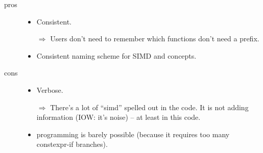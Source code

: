 \begin{description}
  \item[pros]
    \begin{itemize}
      \item Consistent.
      \item[$\Rightarrow$] Users don't need to remember which functions don't
        need a  prefix.

      \item Consistent naming scheme for SIMD and \simdgeneric concepts.
    \end{itemize}

  \item[cons]
    \begin{itemize}
      \item Verbose.
      \item[$\Rightarrow$] There's a lot of “simd” spelled out in the code.
        It is not adding information (IOW: it's noise) -- at least in this
        code.

      \item \simdgeneric programming is barely possible (because it requires
        too many constexpr-if branches).
    \end{itemize}
\end{description}

